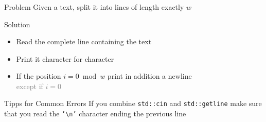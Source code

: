 \begin{frame}
    \frametitle{\problemtitle}
    \begin{block}{Problem}
    	Given a text, split it into lines of length exactly $w$
    \end{block}
	\pause
    \begin{block}{Solution}
    	\begin{itemize}
    		\item Read the complete line containing the text
    		\item Print it character for character
    		\item If the position $i=0\bmod w$ print in addition a newline\\
    		\textcolor{gray}{except if $i=0$}
    	\end{itemize}
    \end{block}
	\pause
	\begin{block}{Tipps for Common Errors}
		If you combine \texttt{std::cin} and \texttt{std::getline} make sure
		that you read the \texttt{'\textbackslash n'} character ending the previous line
	\end{block}
\end{frame}

